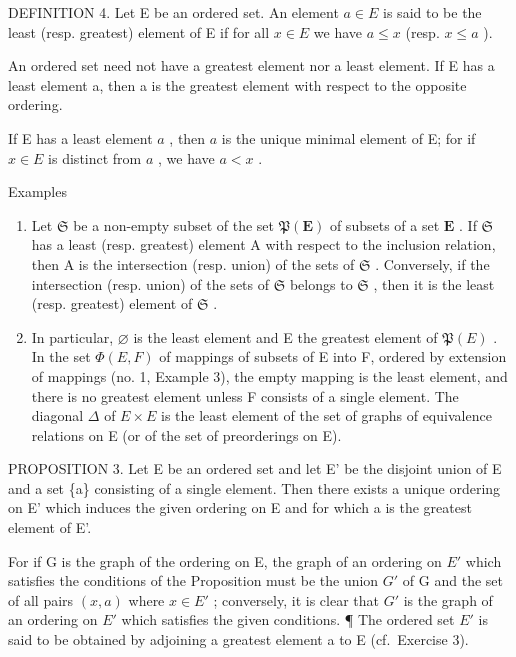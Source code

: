 DEFINITION 4. Let E be an ordered set. An element \(a \in E\) is said to be the least (resp. greatest) element of E if for all \(x \in E\) we have \(a \leqslant x\) (resp. \(x \leqslant a\) ).

An ordered set need not have a greatest element nor a least element. If E has a least element a, then a is the greatest element with respect to the opposite ordering.

If E has a least element \(a\) , then \(a\) is the unique minimal element of E; for if \(x \in E\) is distinct from \(a\) , we have \(a < x\) .

Examples

\begin{enumerate}
\def\labelenumi{(\arabic{enumi})}
\item
  Let \(\mathfrak{S}\) be a non-empty subset of the set \(\mathfrak{P}(\mathbf{E})\) of subsets of a set \(\mathbf{E}\) . If \(\mathfrak{S}\) has a least (resp. greatest) element A with respect to the inclusion relation, then A is the intersection (resp. union) of the sets of \(\mathfrak{S}\) . Conversely, if the intersection (resp. union) of the sets of \(\mathfrak{S}\) belongs to \(\mathfrak{S}\) , then it is the least (resp. greatest) element of \(\mathfrak{S}\) .
\item
  In particular, \(\varnothing\) is the least element and E the greatest element of \(\mathfrak{P}(E)\) . In the set \(\Phi(E, F)\) of mappings of subsets of E into F, ordered by extension of mappings (no. 1, Example 3), the empty mapping is the least element, and there is no greatest element unless F consists of a single element. The diagonal \(\Delta\) of \(E \times E\) is the least element of the set of graphs of equivalence relations on E (or of the set of preorderings on E).
\end{enumerate}

PROPOSITION 3. Let E be an ordered set and let E' be the disjoint union of E and a set \{a\} consisting of a single element. Then there exists a unique ordering on E' which induces the given ordering on E and for which a is the greatest element of E'.

For if G is the graph of the ordering on E, the graph of an ordering on \(E'\) which satisfies the conditions of the Proposition must be the union \(G'\) of G and the set of all pairs \((x, a)\) where \(x \in E'\) ; conversely, it is clear that \(G'\) is the graph of an ordering on \(E'\) which satisfies the given conditions. ¶ The ordered set \(E'\) is said to be obtained by adjoining a greatest element a to E (cf.~Exercise 3).

